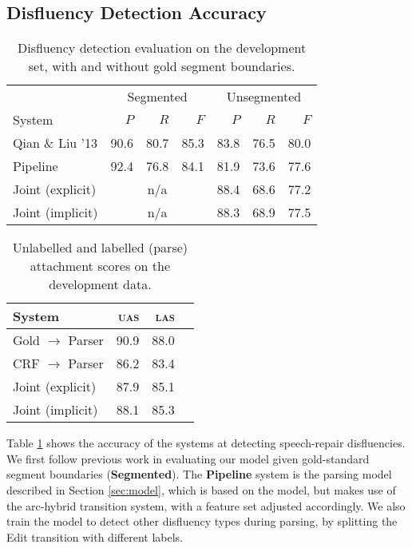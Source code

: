 \documentclass[11pt,letterpaper]{article}
\begin{document}
\subsection{Disfluency Detection Accuracy}

\begin{table}
    \centering
    \small
    \begin{tabular}{l|rrr|rrr}
        & \multicolumn{3}{c|}{Segmented}  & \multicolumn{3}{c}{Unsegmented} \\
        System & $P$ & $R$ & $F$ & $P$ & $R$ & $F$ \\
        \hline \hline
        Qian \& Liu '13         & 90.6 & 80.7  & 85.3  & 83.8 & 76.5 & 80.0 \\
        Pipeline                & 92.4 & 76.8  & 84.1  & 81.9 & 73.6 & 77.6 \\ 
        Joint (explicit)        & \multicolumn{3}{c|}{n/a} & 88.4 & 68.6 & 77.2 \\
        Joint (implicit)        & \multicolumn{3}{c|}{n/a} & 88.3 & 68.9 & 77.5 \\
        \hline
   \end{tabular}
    \caption{\small Disfluency detection evaluation on the development set,
             with and without gold segment boundaries.
         \label{tab:dfl}}
\end{table}

\begin{table}
    \centering
    \small
    \begin{tabular}{l|rrr}
        \hline
        System & \textsc{uas} & \textsc{las} \\
        \hline \hline
        Gold $\rightarrow$ Parser & 90.9 & 88.0 \\
        \hline
        CRF $\rightarrow$  Parser & 86.2 & 83.4 \\
        Joint (explicit)          & 87.9 & 85.1 \\
        Joint (implicit)          & 88.1 & 85.3 \\
        \hline
    \end{tabular}
    \caption{\small Unlabelled and labelled (parse) attachment scores on the
        development data.
        \label{tab:parse}}
\vspace*{-4em}
\end{table}



Table \ref{tab:dfl} shows the accuracy of the systems at detecting speech-repair
disfluencies.  We first follow previous work in evaluating our model given
gold-standard segment boundaries (\textbf{Segmented}).  The \textbf{Pipeline}
system is the parsing model described in Section \ref{sec:model}, which is based
on the \citet{honnibal:14} model, but makes use of the arc-hybrid transition
system, with a feature set adjusted accordingly. We also train the model to
detect other disfluency types during parsing, by splitting the Edit
transition with different labels.
\end{document}
